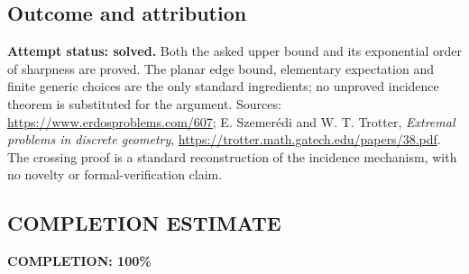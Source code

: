 \subsection*{Outcome and attribution}
\textbf{Attempt status: solved.} Both the asked upper bound and its exponential order of sharpness are proved. The planar edge bound, elementary expectation and finite generic choices are the only standard ingredients; no unproved incidence theorem is substituted for the argument.
Sources: \url{https://www.erdosproblems.com/607}; E. Szemer\'edi and W. T. Trotter, \emph{Extremal problems in discrete geometry}, \url{https://trotter.math.gatech.edu/papers/38.pdf}. The crossing proof is a standard reconstruction of the incidence mechanism, with no novelty or formal-verification claim.

\subsection*{COMPLETION ESTIMATE}
\textbf{COMPLETION: 100\%}
